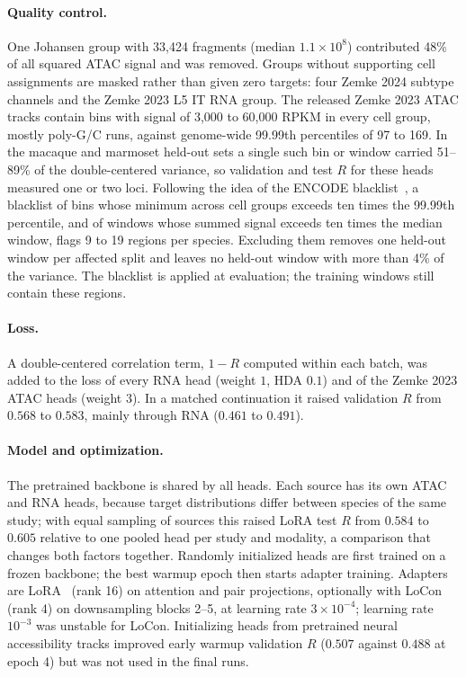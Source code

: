 \documentclass[11pt]{article}
\begin{document}
\paragraph{Quality control.} One Johansen group with 33,424 fragments (median
$1.1\times 10^8$) contributed 48\% of all squared ATAC signal and was removed.
Groups without supporting cell assignments are masked rather than given zero
targets: four Zemke 2024 subtype channels and the Zemke 2023 L5 IT RNA group.
The released Zemke 2023 ATAC tracks contain bins with signal of 3,000 to
60,000 RPKM in every cell group, mostly poly-G/C runs, against genome-wide
99.99th percentiles of 97 to 169. In the macaque and marmoset held-out sets a
single such bin or window carried 51--89\% of the double-centered variance, so
validation and test $R$ for these heads measured one or two loci. Following the
idea of the ENCODE blacklist~\cite{amemiya2019}, a blacklist
of bins whose minimum across cell groups exceeds ten times the 99.99th
percentile, and of windows whose summed signal exceeds ten times the median
window, flags 9 to 19 regions per species. Excluding them removes one held-out
window per affected split and leaves no held-out window with more than 4\% of
the variance. The blacklist is applied at evaluation; the training windows
still contain these regions.

\paragraph{Loss.} A double-centered correlation term, $1-R$ computed within
each batch, was added to the loss of every RNA head (weight $1$, HDA $0.1$) and
of the Zemke 2023 ATAC heads (weight $3$). In a matched continuation it raised
validation $R$ from $0.568$ to $0.583$, mainly through RNA ($0.461$ to $0.491$).

\paragraph{Model and optimization.} The pretrained backbone is shared by all
heads. Each source has its own ATAC and RNA heads, because target
distributions differ between species of the same study; with equal sampling of
sources this raised LoRA test $R$ from $0.584$ to $0.605$ relative to one pooled
head per study and modality, a comparison that changes both factors together.
Randomly initialized heads are first trained on a frozen backbone; the best
warmup epoch then starts adapter training. Adapters are LoRA~\cite{hu2021} (rank 16) on
attention and pair projections, optionally with LoCon~\cite{yeh2024} (rank 4)
on downsampling blocks 2--5, at learning rate $3\times10^{-4}$; learning rate $10^{-3}$ was
unstable for LoCon. Initializing heads from pretrained neural accessibility
tracks improved early warmup validation $R$ ($0.507$ against $0.488$ at epoch
4) but was not used in the final runs.
\end{document}
